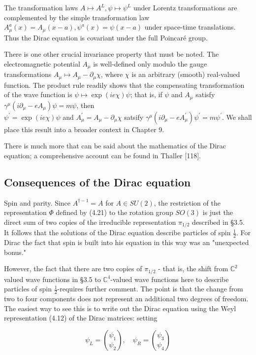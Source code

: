 \documentclass[10pt, letterpaper]{article}
\begin{document}
The transformation laws $A \mapsto A^{L}, \psi \mapsto \psi^{L}$ under Lorentz transformations are complemented by the simple transformation law $A_{\mu}^{a}(x)=A_{\mu}(x-a), \psi^{a}(x)= \psi(x-a)$ under space-time translations. Thus the Dirac equation is covariant under the full Poincaré group.

There is one other crucial invariance property that must be noted. The electromagnetic potential $A_{\mu}$ is well-defined only modulo the gauge transformations $A_{\mu} \mapsto A_{\mu}-\partial_{\mu} \chi$, where $\chi$ is an arbitrary (smooth) real-valued function. The product rule readily shows that the compensating transformation of the wave function is $\psi \mapsto \exp (i e \chi) \psi$; that is, if $\psi$ and $A_{\mu}$ satisfy $\gamma^{\mu}\left(i \partial_{\mu}-e A_{\mu}\right) \psi=m \psi$, then\\
$\psi^{\prime}=\exp (i e \chi) \psi$ and $A_{\mu}^{\prime}=A_{\mu}-\partial_{\mu} \chi$ satsify $\gamma^{\mu}\left(i \partial_{\mu}-e A_{\mu}^{\prime}\right) \psi^{\prime}=m \psi^{\prime}$. We shall place this result into a broader context in Chapter 9.

There is much more that can be said about the mathematics of the Dirac equation; a comprehensive account can be found in Thaller [118].

\subsection*{Consequences of the Dirac equation}
Spin and parity. Since $A^{\dagger-1}=A$ for $A \in S U(2)$, the restriction of the representation $\Phi$ defined by (4.21) to the rotation group $S O(3)$ is just the direct sum of two copies of the irreducible representation $\pi_{1 / 2}$ described in §3.5. It follows that the solutions of the Dirac equation describe particles of spin $\frac{1}{2}$. For Dirac the fact that spin is built into his equation in this way was an "unexpected bonus."

However, the fact that there are two copies of $\pi_{1 / 2}$ - that is, the shift from $\mathbb{C}^{2}$ valued wave functions in §3.5 to $\mathbb{C}^{4}$-valued wave functions here to describe particles of spin $\frac{1}{2}$-requires further comment. The point is that the change from two to four components does not represent an additional two degrees of freedom. The easiest way to see this is to write out the Dirac equation using the Weyl representation (4.12) of the Dirac matrices: setting

$$
\psi_{L}=\binom{\psi_{1}}{\psi_{2}}, \quad \psi_{R}=\binom{\psi_{3}}{\psi_{4}}
$$
\end{document}

